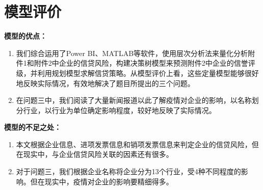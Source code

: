 \ifx\allfiles\undefined


\else
\fi


\part{模型评价}

\noindent \textbf{模型的优点：}

\begin{enumerate}[(1)]
	\item 我们综合运用了Power BI、MATLAB等软件，使用层次分析法来量化分析附件1和附件2中企业的信贷风险，构建决策树模型来预测附件2中企业的信誉评级，并利用规划模型求解信贷策略。从模型评价上看，这些定量模型能够很好地反映实际情况，有效地解决了题目所提出的三个问题。
	\item 在问题三中，我们阅读了大量新闻报道以此了解疫情对企业的影响，以名称划分行业，以行业为单位确定影响程度，较好地反映了实际情况。

\end{enumerate}

\noindent \textbf{模型的不足之处：}

\begin{enumerate}[(1)]
	\item 本文根据企业信息、进项发票信息和销项发票信息来判定企业的信贷风险，但在现实中，与企业信贷风险关联的因素还有很多。
	\item 对于问题三，我们根据企业名称将企业分为13个行业，受4种不同程度的影响。但在现实中，疫情对企业的影响要精细得多。

\end{enumerate}



\ifx\allfiles\undefined

\fi